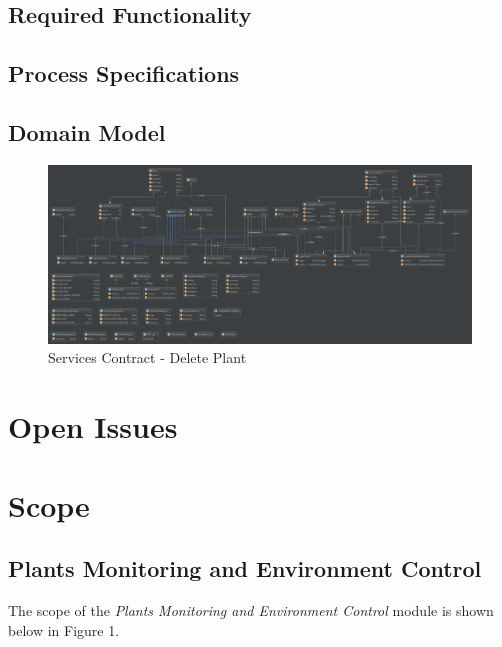 \documentclass{article}
\begin{document}
	\subsection{Required Functionality}
	\subsection{Process Specifications}
		\begin{landscape}
			\subsection{Domain Model}
			\begin{figure}[H]
				\includegraphics[width=\linewidth]{../images/aworldofplants_domain.png}
				\caption{Services Contract - Delete Plant}
			\end{figure}
		\end{landscape}

\newpage
\section{Open Issues}

\section{Scope}
	\subsection{Plants Monitoring and Environment Control}
		The scope of the \emph{Plants Monitoring and Environment Control} module is shown below in Figure 1.
		
\end{document}
